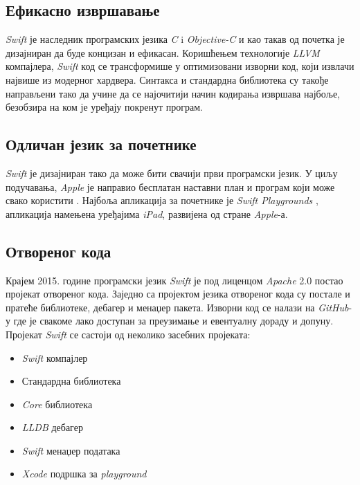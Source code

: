 \documentclass[12pt,oneside]{memoir}
\begin{document}
\subsection{Ефикасно извршавање}

\indent \textit{Swift} је наследник програмских језика \textit{C} i \textit{Objective-C} и као такав од почетка је дизајниран да буде концизан и ефикасан. Коришћењем технологије \textit{LLVM} компајлера, \textit{Swift} код се трансформише у оптимизовани изворни код, који извлачи највише из модерног хардвера. Синтакса и стандардна библиотека су такође направљени тако да учине да се најочитији начин кодирања извршава најбоље, безобзира на ком је уређају покренут програм.

\subsection{Одличан језик за почетнике}

\textit{Swift} је дизајниран тако да може бити свачији први програмски језик. У циљу подучавања, \textit{Apple} је направио бесплатан наставни план и програм који може свако користити \cite{Swift_Education}. Најбоља апликација за почетнике је \textit{Swift Playgrounds} \cite{Swift_Playground}, апликација намењена уређајима \textit{iPad}, развијена од стране \textit{Apple}-а. 

\subsection{Отвореног кода}
\indent Крајем 2015. године програмски језик \textit{Swift} је под лиценцом \textit{Apache} 2.0 постао пројекат отвореног кода. Заједно са пројектом језика отвореног кода су постале и пратеће библиотеке, дебагер и менаџер пакета. Изворни код се налази на \textit{GitHub}-у где је свакоме лако доступан за преузимање и евентуалну дораду и допуну. Пројекат \textit{Swift} се састоји од неколико засебних пројеката: 
\begin{itemize}
    \item \textit{Swift} компајлер
    \item Стандардна библиотека
    \item \textit{Core} библиотека
    \item \textit{LLDB} дебагер
    \item \textit{Swift} менаџер података
    \item \textit{Xcode} подршка за \textit{playground}
\end{itemize}
\end{document}
